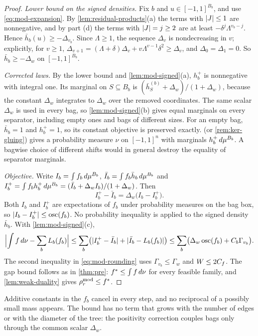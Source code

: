 \begin{proof}
\emph{Lower bound on the signed densities.} Fix $b$ and
$u\in[-1,1]^{B_b}$, and use \eqref{eq:mod-expansion}. By
\cref{lem:residual-products}(a) the terms with $\lvert J\rvert\le1$ are
nonnegative, and by part (d) the terms with $\lvert J\rvert=j\ge2$ are at least
$-\delta^j\Lambda^{v_b-j}$. Hence $\bar h_b(u)\ge-\Delta_{v_b}$. Since
$\Lambda\ge1$, the sequence $\Delta_v$ is nondecreasing in $v$; explicitly,
for $v\ge1$,
$\Delta_{v+1}=(\Lambda+\delta)\Delta_v+v\Lambda^{v-1}\delta^2\ge\Delta_v$,
and $\Delta_0=\Delta_1=0$.
So $\bar h_b\ge-\Delta_w$ on $[-1,1]^{B_b}$.

\emph{Corrected laws.} By the lower bound and \cref{lem:mod-signed}(a),
$h_b^+$ is nonnegative with integral one. Its marginal on $S\subseteq B_b$
is $(\bar h^{(b)}_S+\Delta_w)/(1+\Delta_w)$, because the constant $\Delta_w$
integrates to $\Delta_w$ over the removed coordinates. The same scalar
$\Delta_w$ is used in every bag, so \cref{lem:mod-signed}(b) gives equal
marginals on every separator, including empty ones and bags of different
sizes. For an empty bag, $\bar h_b=1$ and $h_b^+=1$, so its constant
objective is preserved exactly.  (or \cref{rem:ker-gluing}) gives a probability
measure $\nu$ on $[-1,1]^n$ with marginals $h_b^+\,d\mu^{B_b}$. A
bagwise choice of different shifts would in general destroy the equality of
separator marginals.

\emph{Objective.} Write $I_b=\int f_b\,d\mu^{B_b}$,
$\bar I_b=\int f_b\bar h_b\,d\mu^{B_b}$ and
$I^+_b=\int f_bh_b^+\,d\mu^{B_b}=(\bar I_b+\Delta_wI_b)/(1+\Delta_w)$.
Then
\[
  I^+_b-\bar I_b=\Delta_w\bigl(I_b-I^+_b\bigr).
\]
Both $I_b$ and $I^+_b$ are expectations of $f_b$ under probability measures
on the bag box, so $\lvert I_b-I^+_b\rvert\le\operatorname{osc}(f_b)$. No probability
inequality is applied to the signed density $\bar h_b$. With
\cref{lem:mod-signed}(c),
\[
  \Bigl\lvert\int f\,d\nu-\sum_bL_b(f_b)\Bigr\rvert
  \le\sum_b\bigl(\lvert I^+_b-\bar I_b\rvert+\lvert \bar I_b-L_b(f_b)\rvert\bigr)
  \le\sum_b\bigl(\Delta_w\operatorname{osc}(f_b)+C_b\Gamma_{v_b}\bigr).
\]
The second inequality in \eqref{eq:mod-rounding} uses $\Gamma_{v_b}\le
\Gamma_w$ and $W\le2C_f$. The gap bound follows as in \cref{thm:pre}:
$f^{*}\le\int f\,d\nu$ for every feasible family, and
\cref{lem:weak-duality} gives $\rho^{\mathrm{mod}}_r\le f^{*}$.
\end{proof}

Additive constants in the $f_b$ cancel in every step, and no reciprocal of
a possibly small mass appears. The bound has no term that grows with the
number of edges or with the diameter of the tree: the positivity correction
couples bags only through the common scalar $\Delta_w$.

